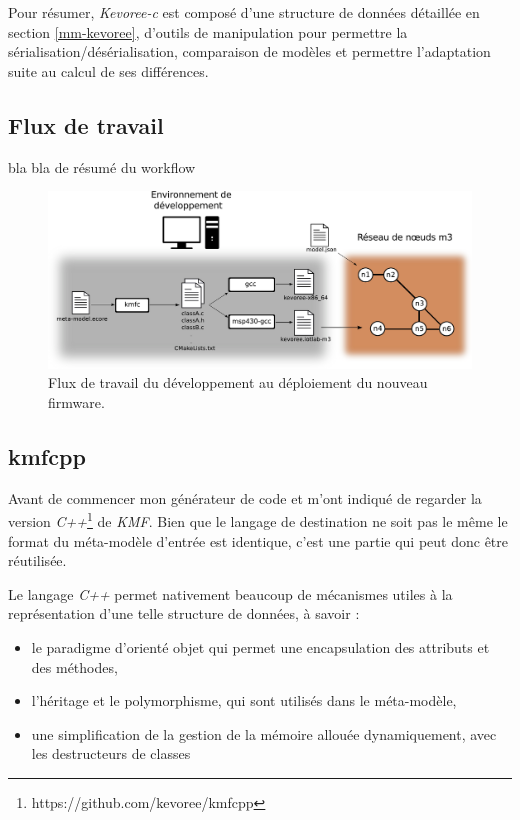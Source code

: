 Pour résumer, \emph{Kevoree-c} est composé d'une structure de données détaillée en section \ref{mm-kevoree}, d'outils de manipulation pour permettre la sérialisation/désérialisation, comparaison de modèles et permettre l'adaptation suite au calcul de ses différences.

\subsection{Flux de travail}

bla bla de résumé du workflow

\begin{figure}[ht!]
\centering
\includegraphics[scale=0.55]{images/workflow-schema/workflow.pdf}
\caption{Flux de travail du développement au déploiement du nouveau firmware.}
\label{workfow}
\end{figure}

\subsection{kmfcpp}

Avant de commencer mon générateur de code \johann et \paco m'ont indiqué de regarder la version \emph{C++}\footnote{https://github.com/kevoree/kmfcpp} de \emph{KMF}. Bien que le langage de destination ne soit pas le même le format du méta-modèle d'entrée est identique, c'est une partie qui peut donc être réutilisée.

Le langage \emph{C++} permet nativement beaucoup de mécanismes utiles à la représentation d'une telle structure de données, à savoir :

\begin{itemize}
\item le paradigme d'orienté objet qui permet une encapsulation des attributs et des méthodes,
\item l'héritage et le polymorphisme, qui sont utilisés dans le méta-modèle,
\item une simplification de la gestion de la mémoire allouée dynamiquement, avec les destructeurs de classes
\end{itemize}

